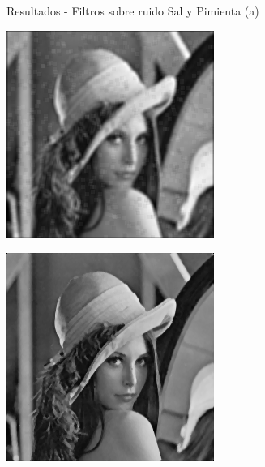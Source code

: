 \documentclass{beamer}
\begin{document}
\begin{frame}[fragile]{Resultados - Filtros sobre ruido Sal y Pimienta (a)}
\begin{minipage}{0.32\linewidth}
		\includegraphics[width=\linewidth]{../results/lena_ej12a1}
		\label{fig:lenaej12a1}
	\end{minipage}\hfill
	\begin{minipage}{0.32\linewidth}
		\centering
		\includegraphics[width=\linewidth]{../results/lena_ej12a2}
		\label{fig:lenaej12a2}
	\end{minipage}
\end{frame}
\end{document}
